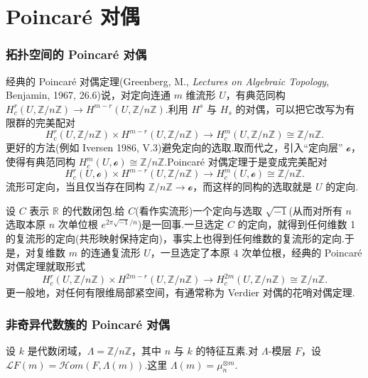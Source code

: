 ﻿%
\chapter{Poincar\'e 对偶}\label{sec:24}

\subsection*{拓扑空间的 Poincar\'e 对偶}

经典的 Poincar\'e 对偶定理(Greenberg, M., \emph{Lectures on Algebraic Topology}, Benjamin, 1967, 26.6)说，对定向连通 $m$ 维流形 $U$，有典范同构 $H^{r}_{c}(U, \mathbb{Z}/n\mathbb{Z}) \to H^{m-r}(U, \mathbb{Z}/n\mathbb{Z})$.利用 $H^{s}$ 与 $H_{s}$ 的对偶，可以把它改写为有限群的完美配对
\[
H^{r}_{c}(U, \mathbb{Z}/n\mathbb{Z}) \times H^{m-r}(U, \mathbb{Z}/n\mathbb{Z}) \to H^{m}_{c}(U, \mathbb{Z}/n\mathbb{Z}) \cong \mathbb{Z}/n\mathbb{Z}.
\]
更好的方法(例如 Iversen 1986, V.3)避免定向的选取.取而代之，引入``定向层'' $\mathcal{o}$，使得有典范同构 $H^{m}_{c}(U, \mathcal{o}) \cong \mathbb{Z}/n\mathbb{Z}$.Poincar\'e 对偶定理于是变成完美配对
\[
H^{r}_{c}(U, \mathcal{o}) \times H^{m-r}(U, \mathbb{Z}/n\mathbb{Z}) \to H^{m}_{c}(U, \mathcal{o}) \cong \mathbb{Z}/n\mathbb{Z}.
\]
流形可定向，当且仅当存在同构 $\mathbb{Z}/n\mathbb{Z} \to \mathcal{o}$，而这样的同构的选取就是 $U$ 的定向.

设 $C$ 表示 $\mathbb{R}$ 的代数闭包.给 $C$(看作实流形)一个定向与选取 $\sqrt{-1}$(从而对所有 $n$ 选取本原 $n$ 次单位根 $e^{2\pi\sqrt{-1}/n}$)是一回事.一旦选定 $C$ 的定向，就得到任何维数 1 的复流形的定向(共形映射保持定向)，事实上也得到任何维数的复流形的定向.于是，对复维数 $m$ 的连通复流形 $U$，一旦选定了本原 4 次单位根，经典的 Poincar\'e 对偶定理就取形式
\[
H^{r}_{c}(U, \mathbb{Z}/n\mathbb{Z}) \times H^{2m-r}(U, \mathbb{Z}/n\mathbb{Z}) \to H^{2m}_{c}(U, \mathbb{Z}/n\mathbb{Z}) \cong \mathbb{Z}/n\mathbb{Z}.
\]
更一般地，对任何有限维局部紧空间，有通常称为 Verdier 对偶的花哨对偶定理.

\subsection*{非奇异代数簇的 Poincar\'e 对偶}

设 $k$ 是代数闭域，$\Lambda = \mathbb{Z}/n\mathbb{Z}$，其中 $n$ 与 $k$ 的特征互素.对 $\Lambda$-模层 $F$，设 $\mathcal{L}F(m) = \mathcal{H}om(F, \Lambda(m))$.这里 $\Lambda(m) = \mu^{\otimes m}_{n}$.


